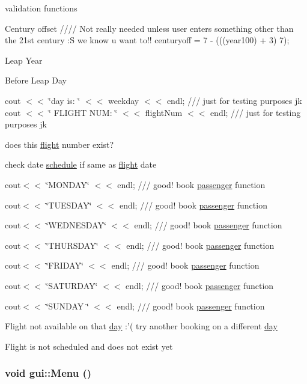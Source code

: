 validation functions 

Century offset //// Not really needed unless user enters something other than the 21st century :S we know u want to!! centuryoff = 7 -\/ (((year100) + 3) 7);

Leap Year

Before Leap Day

cout $<$$<$ \char`\"{}day is: \char`\"{} $<$$<$ weekday $<$$<$ endl; /// just for testing purposes jk cout $<$$<$ \char`\"{} FLIGHT NUM: \char`\"{} $<$$<$ flightNum $<$$<$ endl; /// just for testing purposes jk

does this \hyperlink{classflight}{flight} number exist?

check date \hyperlink{classschedule}{schedule} if same as \hyperlink{classflight}{flight} date

cout$<$$<$ \char`\"{}MONDAY\char`\"{} $<$$<$ endl; /// good! book \hyperlink{classpassenger}{passenger} function

cout$<$$<$ \char`\"{}TUESDAY\char`\"{} $<$$<$ endl; /// good! book \hyperlink{classpassenger}{passenger} function

cout$<$$<$ \char`\"{}WEDNESDAY\char`\"{} $<$$<$ endl; /// good! book \hyperlink{classpassenger}{passenger} function

cout$<$$<$ \char`\"{}THURSDAY\char`\"{} $<$$<$ endl; /// good! book \hyperlink{classpassenger}{passenger} function

cout$<$$<$ \char`\"{}FRIDAY\char`\"{} $<$$<$ endl; /// good! book \hyperlink{classpassenger}{passenger} function

cout$<$$<$ \char`\"{}SATURDAY\char`\"{} $<$$<$ endl; /// good! book \hyperlink{classpassenger}{passenger} function

cout$<$$<$ \char`\"{}SUNDAY \char`\"{} $<$$<$ endl; /// good! book \hyperlink{classpassenger}{passenger} function

Flight not available on that \hyperlink{classday}{day} :'( try another booking on a different \hyperlink{classday}{day}

Flight is not scheduled and does not exist yet \hypertarget{classgui_a57cd3dc1eca1d8cb7aabb9fa75d79702}{
\subsubsection[{Menu}]{\setlength{\rightskip}{0pt plus 5cm}void gui::Menu ()}}
\label{classgui_a57cd3dc1eca1d8cb7aabb9fa75d79702}


